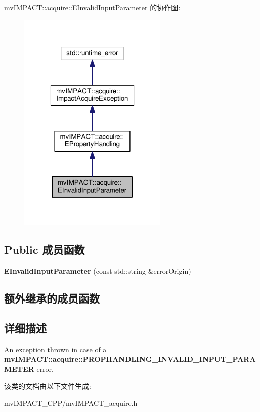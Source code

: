 mv\+I\+M\+P\+A\+C\+T\+:\+:acquire\+:\+:E\+Invalid\+Input\+Parameter 的协作图\+:
\nopagebreak
\begin{figure}[H]
\begin{center}
\leavevmode
\includegraphics[width=202pt]{classmv_i_m_p_a_c_t_1_1acquire_1_1_e_invalid_input_parameter__coll__graph}
\end{center}
\end{figure}
\subsection*{Public 成员函数}
\begin{DoxyCompactItemize}
\item 
\hypertarget{classmv_i_m_p_a_c_t_1_1acquire_1_1_e_invalid_input_parameter_a1eaba6151cf83833cc816413f05156d8}{{\bfseries E\+Invalid\+Input\+Parameter} (const std\+::string \&error\+Origin)}\label{classmv_i_m_p_a_c_t_1_1acquire_1_1_e_invalid_input_parameter_a1eaba6151cf83833cc816413f05156d8}

\end{DoxyCompactItemize}
\subsection*{额外继承的成员函数}


\subsection{详细描述}
An exception thrown in case of a {\bfseries mv\+I\+M\+P\+A\+C\+T\+::acquire\+::\+P\+R\+O\+P\+H\+A\+N\+D\+L\+I\+N\+G\+\_\+\+I\+N\+V\+A\+L\+I\+D\+\_\+\+I\+N\+P\+U\+T\+\_\+\+P\+A\+R\+A\+M\+E\+T\+E\+R} error. 

该类的文档由以下文件生成\+:\begin{DoxyCompactItemize}
\item 
mv\+I\+M\+P\+A\+C\+T\+\_\+\+C\+P\+P/mv\+I\+M\+P\+A\+C\+T\+\_\+acquire.\+h\end{DoxyCompactItemize}

